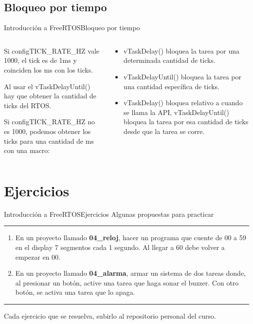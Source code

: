 \documentclass[aspectratio=169, xcolor=dvipsnames]{beamer}
\begin{document}
\subsection{Bloqueo por tiempo}
\begin{frame}{Introducción a FreeRTOS}{Bloqueo por tiempo}
\begin{columns}
\begin{column}{0.5\textwidth}
Si \textcolor{myblue}{configTICK\_RATE\_HZ} vale 1000, el tick es de 1ms y coinciden los ms con los ticks.

Al usar el \textcolor{myblue}{vTaskDelayUntil()} hay que obtener la cantidad de ticks del RTOS. 

Si \textcolor{myblue}{configTICK\_RATE\_HZ} no es 1000, podemos obtener los ticks para una cantidad de ms con una macro:

\end{column}
\begin{column}{0.5\textwidth}
\begin{itemize}
    \item \textcolor{myblue}{vTaskDelay()} bloquea la tarea por una determinada cantidad de ticks.
    \item \textcolor{myblue}{vTaskDelayUntil()} bloquea la tarea por una cantidad específica de ticks.
    \item \textcolor{myblue}{vTaskDelay()} bloquea relativo a cuando se llama la API, \textcolor{myblue}{vTaskDelayUntil()} bloquea la tarea por esa cantidad de ticks desde que la tarea se corre.
\end{itemize}
\end{column}
\end{columns}
\end{frame}

\section{Ejercicios}
\begin{frame}{Introducción a FreeRTOS}{Ejercicios}
    Algunas propuestas para practicar
    \noindent\rule{\textwidth}{0.75pt}
    \begin{enumerate}
        \item En un proyecto llamado \textbf{04\_reloj}, hacer un programa que cuente de 00 a 59 en el display 7 segmentos cada 1 segundo. Al llegar a 60 debe volver a empezar en 00.
        \item En un proyecto llamado \textbf{04\_alarma}, armar un sistema de dos tareas donde, al presionar un botón, active una tarea que haga sonar el buzzer. Con otro botón, se activa una tarea que lo apaga.
    \end{enumerate}
    \noindent\rule{\textwidth}{0.75pt}
    Cada ejercicio que se resuelva, subirlo al repositorio personal del curso.
\end{frame}
\end{document}
